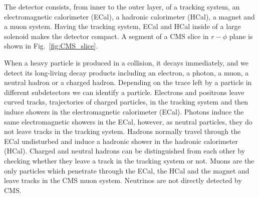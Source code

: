 The detector consists, from inner to the outer layer,  of a tracking system, an electromagnetic calorimeter (ECal), a hadronic calorimeter (HCal), a magnet and a muon system. Having the tracking system, ECal and HCal inside of a large solenoid makes the detector compact. A segment of a CMS slice in $r-\phi$ plane is shown in Fig.~\ref{fig:CMS_slice}.

When a heavy particle is produced in a collision, it decays immediately, and we detect its long-living decay products including an electron, a photon, a muon, a neutral hadron or a charged hadron. Depending on the trace left by a particle in different subdetectors we can identify a particle. Electrons and positrons leave curved tracks, trajectories of charged particles, in the tracking system and then induce showers in the electromagnetic calorimeter (ECal). Photons induce the same electromagnetic showers in the ECal, however, as neutral particles, they do not leave tracks in the tracking system. Hadrons normally travel through the ECal undisturbed and induce a hadronic shower in the hadronic calorimeter (HCal). Charged and neutral hadrons can be distinguished from each other by checking whether they leave a track in the tracking system or not. Muons are the only particles which penetrate through the ECal, the HCal and the magnet and leave tracks in the CMS muon system. Neutrinos are not directly detected by CMS.   

